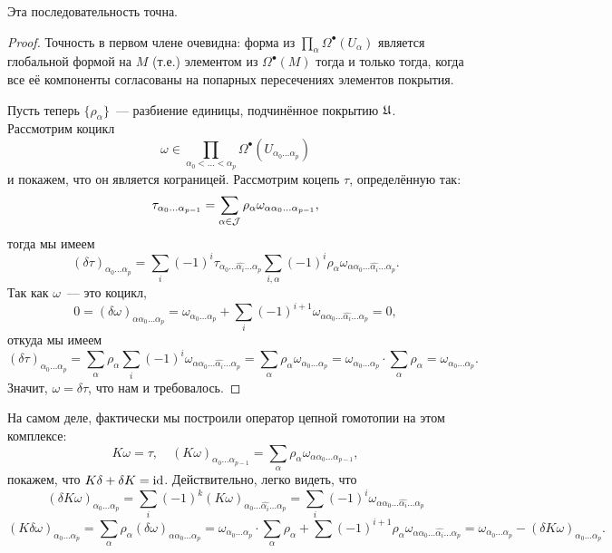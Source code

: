 	 \begin{statement} 
	 	Эта последовательность точна.
	 \end{statement}
	 \begin{proof}
	 	
	 	Точность в первом члене очевидна: форма из $\prod_{\alpha} \Omega^{\bullet}(U_{\alpha})$ является глобальной формой на $M$ (т.е.) элементом из $\Omega^{\bullet}(M)$ тогда и только тогда, когда все её компоненты согласованы на попарных пересечениях элементов покрытия. 

	 	Пусть теперь $\{ \rho_{\alpha} \}$~--- разбиение единицы, подчинённое покрытию $\mathfrak{U}$. Рассмотрим коцикл 
	 	\[
	 		\omega \in \prod_{\alpha_0 < \ldots < \alpha_p} \Omega^{\bullet}(U_{\alpha_0 \ldots \alpha_p} )
	 	\]
	 	и покажем, что он является кограницей. Рассмотрим коцепь $\tau$, определённую так:
	 	\[
	 		\tau_{\alpha_0 \ldots \alpha_{p - 1}} = \sum_{\alpha \in \mathcal{J}} \rho_{\alpha} \omega_{\alpha \alpha_0 \ldots \alpha_{p - 1}},
	 	\]
	 	тогда мы имеем 
	 	\[
	 		(\delta \tau)_{\alpha_0 \ldots \alpha_p} = \sum_{i} (-1)^i \tau_{\alpha_0 \ldots \widehat{\alpha_i} \ldots \alpha_p} \sum_{i, \alpha} (-1)^i \rho_{\alpha} \omega_{\alpha \alpha_0 \ldots \widehat{\alpha_i} \ldots \alpha_p}.
 	 	\]
 	 	Так как $\omega$~--- это коцикл, 
 	 	\[
 	 		0 = (\delta \omega)_{\alpha \alpha_0 \ldots \alpha_p} = \omega_{\alpha_0 \ldots \alpha_p} + \sum_{i} (-1)^{i + 1} \omega_{\alpha \alpha_0 \ldots \widehat{\alpha_i} \ldots \alpha_p} = 0,
 	 	\]
 	 	откуда мы имеем 
 	 	\[
 	 		(\delta \tau)_{\alpha_0 \ldots \alpha_p} = \sum_{\alpha} \rho_{\alpha} \sum_{i} (-1)^i \omega_{\alpha \alpha_0 \ldots \widehat{\alpha_i} \ldots \alpha_p} = \sum_{\alpha} \rho_{\alpha} \omega_{\alpha_0 \ldots \alpha_p} = \omega_{\alpha_0 \ldots \alpha_p} \cdot \sum_{\alpha} \rho_{\alpha} = \omega_{\alpha_0 \ldots \alpha_p} .
 	 	\]
 	 	Значит, $\omega = \delta \tau$, что нам и требовалось. 

	 	
	 \end{proof}

	 На самом деле, фактически мы построили оператор цепной гомотопии на этом комплексе: 
	 \[
	 	K\omega = \tau, \quad (K\omega)_{\alpha_0 \ldots \alpha_{p - 1}} = \sum_{\alpha} \rho_{\alpha} \omega_{\alpha \alpha_0 \ldots \alpha_{p - 1}}, 
	 \]
	 покажем, что $K \delta + \delta K = \operatorname{id}$. Действительно, легко видеть, что 
	 \[
	 	(\delta K \omega)_{\alpha_0 \ldots \alpha_p} = \sum_{i}(-1)^k (K\omega)_{\alpha_0 \ldots \widehat{\alpha_i} \ldots \alpha_p} = \sum_{i} (-1)^i \omega_{\alpha \alpha_0 \ldots \widehat{\alpha_i} \ldots \alpha_p}
	 \]
	 \[
	 	(K \delta \omega)_{\alpha_0 \ldots \alpha_p} = \sum_{\alpha} \rho_{\alpha} (\delta \omega)_{\alpha \alpha_0 \ldots \alpha_p} = \omega_{\alpha_0 \ldots \alpha_p} \cdot \sum_{\alpha} \rho_{\alpha} + \sum (-1)^{i + 1} \rho_{\alpha} \omega_{\alpha \alpha_0 \ldots \widehat{\alpha_i} \ldots \alpha_p} = \omega_{\alpha_0 \ldots \alpha_p} - (\delta K \omega)_{\alpha_0 \ldots \alpha_p}.
	 \]

